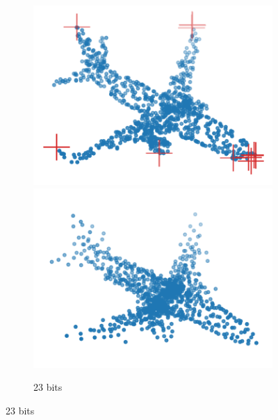 \begin{figure}[t]
\begin{subfigure}[b]{\subfigureouterhspace}
\begin{subsubfigure}[b]{\subfigurehspace}
      \includegraphics[width=\linewidth]{img/point_cloud_compression/crit/test_airplane_0630/micro_2.pdf}
      \includegraphics[width=\linewidth]{img/point_cloud_compression/rec/test_airplane_0630/micro_2.pdf}
      \caption{23 bits}
      \label{fig:rec/micro/2}
    \end{subsubfigure}%
    \hfill%
    \begin{subsubfigure}[b]{\subfigurehspace}
      \centering

\end{subsubfigure}
\end{subfigure}
\end{figure}
